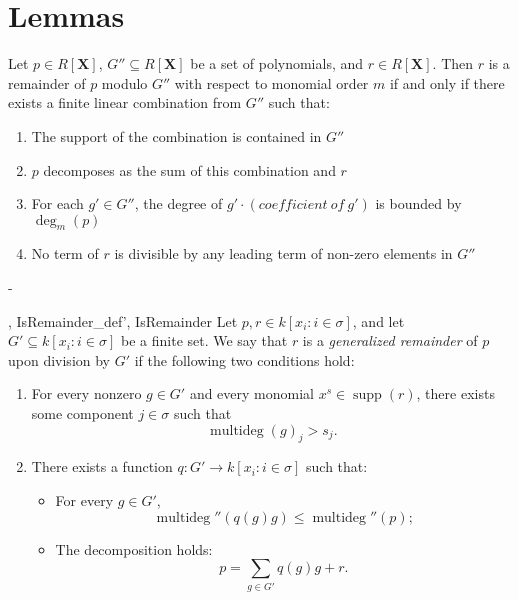 \chapter{Lemmas}

\begin{lemma}\label{zero_le}
  \leanok


\end{lemma}

\begin{lemma}\label{IsRemainder_def'}
  \leanok
  Let $p \in R[\mathbf{X}]$, $G'' \subseteq R[\mathbf{X}]$ be a set of polynomials,
and $r \in R[\mathbf{X}]$. Then $r$ is a remainder of $p$ modulo $G''$ with respect to
monomial order $m$ if and only if there exists a finite linear combination from $G''$
such that:
\begin{enumerate}
\item The support of the combination is contained in $G''$
\item $p$ decomposes as the sum of this combination and $r$
\item For each $g' \in G''$, the degree of $g' \cdot (coefficient\ of\ g')$
  is bounded by $\deg_m(p)$
\item No term of $r$ is divisible by any leading term of non-zero elements in $G''$
\end{enumerate}
-
\end{lemma}

\begin{lemma}\label{IsRemainder_def''}
  \leanok
  ,
{IsRemainder_def'},
{IsRemainder}
  Let \( p, r \in k[x_i : i \in \sigma] \), and let \( G' \subseteq k[x_i : i \in \sigma] \) be a finite set.
We say that \( r \) is a \emph{generalized remainder} of \( p \) upon division by \( G' \) if the following two conditions hold:

\begin{enumerate}
\item For every nonzero \( g \in G' \) and every monomial \( x^s \in \operatorname{supp}(r) \),
there exists some component \( j \in \sigma \) such that
\[
\operatorname{multideg}(g)_j > s_j.
\]
\item There exists a function \( q : G' \to k[x_i : i \in \sigma] \) such that:
\begin{itemize}
\item For every \( g \in G' \),
  \[
  \operatorname{multideg}''(q(g)g) \leq \operatorname{multideg}''(p);
  \]
\item The decomposition holds:
  \[
  p = \sum_{g \in G'} q(g)g + r.
  \]
\end{itemize}
\end{enumerate}

\end{lemma}

